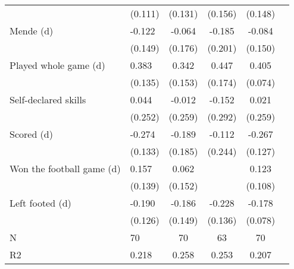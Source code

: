 {\begin{tabularx}{\textwidth}{Xl*{4}{c}}
                    &     (0.111)         &     (0.131)         &     (0.156)         &     (0.148)         \\
[0.5em]
Mende (d)           &      -0.122         &      -0.064         &      -0.185         &      -0.084         \\
                    &     (0.149)         &     (0.176)         &     (0.201)         &     (0.150)         \\
[0.5em]
Played whole game (d)&       0.383\sym{***}&       0.342\sym{**} &       0.447\sym{**} &       0.405\sym{***}\\
                    &     (0.135)         &     (0.153)         &     (0.174)         &     (0.074)         \\
[0.5em]
Self-declared skills&       0.044         &      -0.012         &      -0.152         &       0.021         \\
                    &     (0.252)         &     (0.259)         &     (0.292)         &     (0.259)         \\
[0.5em]
Scored (d)          &      -0.274\sym{**} &      -0.189         &      -0.112         &      -0.267\sym{**} \\
                    &     (0.133)         &     (0.185)         &     (0.244)         &     (0.127)         \\
[0.5em]
Won the football game (d)&       0.157         &       0.062         &                     &       0.123         \\
                    &     (0.139)         &     (0.152)         &                     &     (0.108)         \\
[0.5em]
Left footed (d)     &      -0.190         &      -0.186         &      -0.228\sym{*}  &      -0.178\sym{**} \\
                    &     (0.126)         &     (0.149)         &     (0.136)         &     (0.078)         \\
\hline
N                   &          70         &          70         &          63         &          70         \\
R2                  &       0.218         &       0.258         &       0.253         &       0.207         \\
\hline\hline
\end{tabularx}
}
